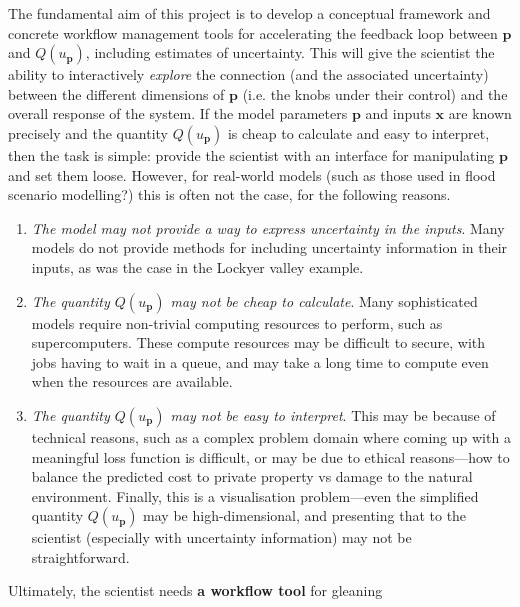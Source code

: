 \documentclass[a4paper,fontsize=12pt]{scrartcl}
\begin{document}
The fundamental aim of this project is to develop a conceptual
framework and concrete workflow management tools for accelerating the
feedback loop between $\mathbf{p}$ and $Q(u_{\mathbf{p}})$, including
estimates of uncertainty. This will give the scientist the ability to
interactively \emph{explore} the connection (and the associated
uncertainty) between the different dimensions of $\mathbf{p}$ (i.e.
the knobs under their control) and the overall response of the
system. If the model
parameters $\mathbf{p}$ and inputs $\mathbf{x}$ are known precisely
and the quantity $Q(u_{\mathbf{p}})$ is cheap to calculate and easy to
interpret, then the task is simple: provide the scientist with an
interface for manipulating $\mathbf{p}$ and set them loose. However,
for real-world models (such as those used in flood scenario
modelling?) this is often not the case, for the following reasons.
\begin{enumerate}
\item \emph{The model may not provide a way to express uncertainty in
    the inputs}. Many models do not provide methods for including
  uncertainty information in their inputs, as was the case in the
  Lockyer valley example.
\item \emph{The quantity $Q(u_{\mathbf{p}})$ may not be cheap to
    calculate}. Many sophisticated models require non-trivial
  computing resources to perform, such as supercomputers. These
  compute resources may be difficult to secure, with jobs having to
  wait in a queue, and may take a long time to compute even when the
  resources are available.
\item \emph{The quantity $Q(u_{\mathbf{p}})$ may not be easy to
    interpret}. This may be because of technical reasons, such as a
  complex problem domain where coming up with a meaningful loss
  function is difficult, or may be due to ethical reasons---how to
  balance the predicted cost to private property vs damage to the
  natural environment. Finally, this is a visualisation problem---even
  the simplified quantity $Q(u_{\mathbf{p}})$ may be high-dimensional,
  and presenting that to the scientist (especially with uncertainty
  information) may not be straightforward.
\end{enumerate}
Ultimately, the scientist needs \textbf{a workflow tool} for gleaning
\end{document}
